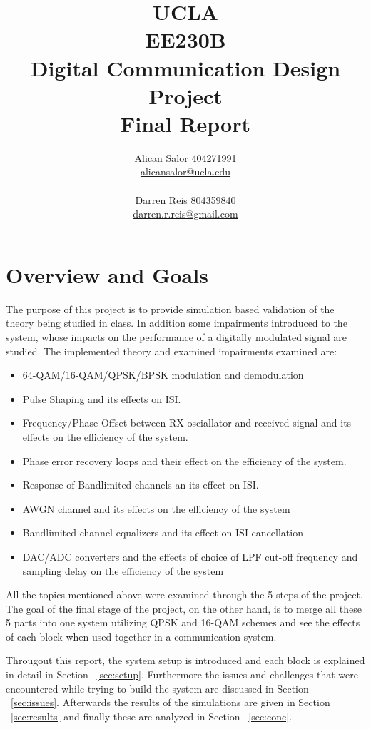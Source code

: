 \documentclass[]{article}
\title{UCLA\\EE230B\\Digital Communication Design Project\\Final Report}
\author{Alican Salor 404271991 \\  \href{mailto:alicansalor@ucla.edu}{alicansalor@ucla.edu} \\ \\
Darren Reis 804359840 \\
\href{mailto:darrer.r.reis@gmail.com}{darren.r.reis@gmail.com} }
\begin{document}
\maketitle

\newpage
\tableofcontents
\newpage
\section{Overview and Goals}
\label{sec:overview}

The purpose of this project is to provide simulation based validation of the theory being studied in class. 
In addition some impairments introduced to the system, whose impacts on the performance of a digitally modulated signal are studied. The implemented theory and examined impairments examined are:
\begin{itemize}
\item 64-QAM/16-QAM/QPSK/BPSK modulation and demodulation
\item Pulse Shaping and its effects on ISI.
\item Frequency/Phase Offset between RX osciallator and received signal and its effects on the efficiency of the system.
\item Phase error recovery loops and their effect on the efficiency of the system.
\item Response of Bandlimited channels an its effect on ISI.
\item AWGN channel and its effects on the efficiency of the system
\item Bandlimited channel equalizers and its effect on ISI cancellation
\item DAC/ADC converters and the effects of choice of LPF cut-off frequency and sampling delay on the efficiency of the system  
\end{itemize}

All the topics mentioned above were examined through the 5 steps of the project. The goal of the final stage of the project, on the other hand, is to merge all these 5 parts into one system utilizing QPSK and 16-QAM schemes and see the effects of each block when used together in a communication system. 

Througout this report, the system setup is introduced and each block is explained in detail in Section ~\ref{sec:setup}. Furthermore the issues and challenges that were encountered while trying to build the system are discussed in Section ~\ref{sec:issues}. Afterwards the results of the simulations are given in Section ~\ref{sec:results} and finally these are analyzed in Section ~\ref{sec:conc}.  
\end{document}
